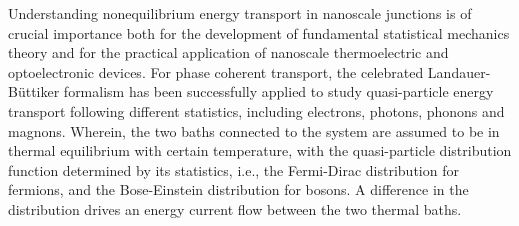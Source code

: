 \documentclass[aps
,twocolumn
,floatfix,footinbib,prl
]{revtex4-1}
\begin{document}

Understanding nonequilibrium energy transport in nanoscale junctions is of crucial importance both for the development of fundamental statistical mechanics theory and for the practical application of nanoscale thermoelectric and optoelectronic devices. For phase coherent transport, the celebrated Landauer-B\"uttiker formalism has been successfully applied to study quasi-particle energy transport following different statistics, including electrons\cite{imry1999conductance}, photons\cite{ojanen2008mesoscopic,biehs2010mesoscopic,zhang2018energy,benabdallah2014near}, phonons\cite{rego1998quantized,mingo2005carbon,yamamoto2006nonequilibrium,wang2006nonequilibrium,wang2007nonequilibrium,wang2008quantum,ruokola2009thermal,li2012colloquium,taylor2015quantum,wang2016landauer} and magnons\cite{wang2004spin}.
Wherein, the two baths connected to the system are assumed to be in thermal equilibrium with certain temperature, with the quasi-particle distribution function  determined by its statistics, i.e., the Fermi-Dirac distribution for fermions, and the Bose-Einstein distribution for bosons. A difference in the distribution drives an energy current flow between the two thermal baths. 

\end{document}
